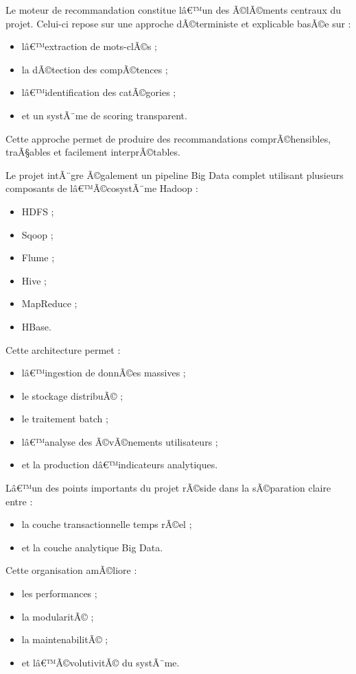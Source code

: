 ﻿\documentclass[12pt,a4paper]{report}
\begin{document}
Le moteur de recommandation constitue lâ€™un des Ã©lÃ©ments centraux du projet. Celui-ci repose sur une approche dÃ©terministe et explicable basÃ©e sur :
\begin{itemize}
    \item lâ€™extraction de mots-clÃ©s ;
    \item la dÃ©tection des compÃ©tences ;
    \item lâ€™identification des catÃ©gories ;
    \item et un systÃ¨me de scoring transparent.
\end{itemize}

Cette approche permet de produire des recommandations comprÃ©hensibles, traÃ§ables et facilement interprÃ©tables.

\vspace{0.5cm}

Le projet intÃ¨gre Ã©galement un pipeline Big Data complet utilisant plusieurs composants de lâ€™Ã©cosystÃ¨me Hadoop :
\begin{itemize}
    \item HDFS ;
    \item Sqoop ;
    \item Flume ;
    \item Hive ;
    \item MapReduce ;
    \item HBase.
\end{itemize}

Cette architecture permet :
\begin{itemize}
    \item lâ€™ingestion de donnÃ©es massives ;
    \item le stockage distribuÃ© ;
    \item le traitement batch ;
    \item lâ€™analyse des Ã©vÃ©nements utilisateurs ;
    \item et la production dâ€™indicateurs analytiques.
\end{itemize}

Lâ€™un des points importants du projet rÃ©side dans la sÃ©paration claire entre :
\begin{itemize}
    \item la couche transactionnelle temps rÃ©el ;
    \item et la couche analytique Big Data.
\end{itemize}

Cette organisation amÃ©liore :
\begin{itemize}
    \item les performances ;
    \item la modularitÃ© ;
    \item la maintenabilitÃ© ;
    \item et lâ€™Ã©volutivitÃ© du systÃ¨me.
\end{itemize}
\end{document}
